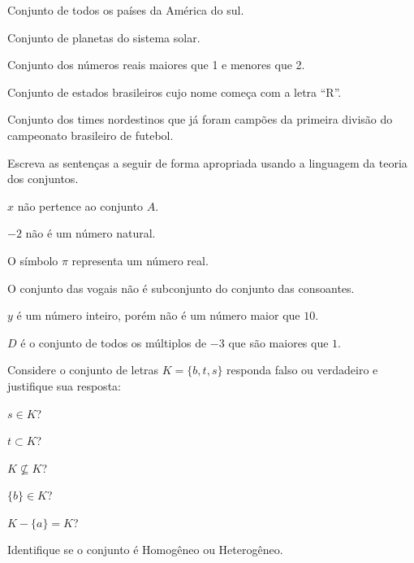 \begin{exerList}
	\item Conjunto de todos os países da América do sul.
	\item Conjunto de planetas do sistema solar.
	\item Conjunto dos números reais maiores que 1 e menores que 2.
	\item Conjunto de estados brasileiros cujo nome começa com a letra ``R''.
	\item Conjunto dos times nordestinos que já foram campões da primeira divisão do campeonato brasileiro de futebol.
\end{exerList}


\begin{questao}\label{test:Conjuntos3}
	Escreva as sentenças a seguir de forma apropriada usando a linguagem da teoria dos conjuntos.
\end{questao}

\begin{exerList}
	\item $x$ não pertence ao conjunto $A$.
	\item $-2$ não é um número natural.
	\item O símbolo $\pi$ representa um número real.
	\item O conjunto das vogais não é subconjunto do conjunto das consoantes.
	\item $y$ é um número inteiro, porém não é um número maior que $10$.
	\item $D$ é o conjunto de todos os múltiplos de $-3$ que são maiores que $1$.
\end{exerList}

\begin{questao}\label{test:Conjuntos4}
	Considere o conjunto de letras $K = \{b, t, s\}$ responda falso ou verdadeiro e justifique sua resposta:
\end{questao}

\begin{exerList}
	\item $s \in K$?
	\item $t \subset K$?
	\item $K \not\subseteq K$?
	\item $\{b\} \in K$?
	\item $K - \{a\} = K$?
\end{exerList}

\begin{questao}
  Identifique se o conjunto é Homogêneo ou Heterogêneo.
\end{questao}

